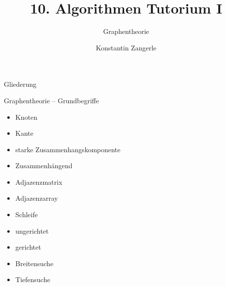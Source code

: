 \documentclass[18pt]{beamer}
\title[Algo I Tut]{10. Algorithmen Tutorium I}
\subtitle{Graphentheorie}
\author[Zangerle]{Konstantin Zangerle}
\institute{Institut für Theoretische Informatik}
\begin{document}

\begin{frame}
\titlepage
\end{frame}

\begin{frame}{Gliederung}
 \tableofcontents
\end{frame}

\begin{frame}{Graphentheorie -- Grundbegriffe}
 \begin{itemize}
  \item Knoten
  \item Kante
  \item starke Zusammenhangskomponente
  \item Zusammenhängend
  \item Adjazenzmatrix
  \item Adjazenzarray
  \item Schleife
  \item ungerichtet
  \item gerichtet
  \item Breitensuche
  \item Tiefensuche
 \end{itemize}
\end{frame}
\end{document}
